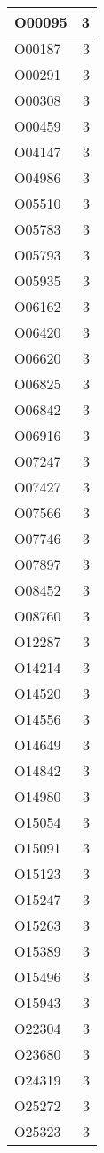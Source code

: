 \documentclass[
]{book}
\theoremstyle{definition}
\theoremstyle{definition}
\theoremstyle{definition}
\theoremstyle{definition}
\theoremstyle{remark}
\begin{document}
\begin{table}
\begin{tabular}{l|r}
\hline
O00095 & 3\\
\hline
O00187 & 3\\
\hline
O00291 & 3\\
\hline
O00308 & 3\\
\hline
O00459 & 3\\
\hline
O04147 & 3\\
\hline
O04986 & 3\\
\hline
O05510 & 3\\
\hline
O05783 & 3\\
\hline
O05793 & 3\\
\hline
O05935 & 3\\
\hline
O06162 & 3\\
\hline
O06420 & 3\\
\hline
O06620 & 3\\
\hline
O06825 & 3\\
\hline
O06842 & 3\\
\hline
O06916 & 3\\
\hline
O07247 & 3\\
\hline
O07427 & 3\\
\hline
O07566 & 3\\
\hline
O07746 & 3\\
\hline
O07897 & 3\\
\hline
O08452 & 3\\
\hline
O08760 & 3\\
\hline
O12287 & 3\\
\hline
O14214 & 3\\
\hline
O14520 & 3\\
\hline
O14556 & 3\\
\hline
O14649 & 3\\
\hline
O14842 & 3\\
\hline
O14980 & 3\\
\hline
O15054 & 3\\
\hline
O15091 & 3\\
\hline
O15123 & 3\\
\hline
O15247 & 3\\
\hline
O15263 & 3\\
\hline
O15389 & 3\\
\hline
O15496 & 3\\
\hline
O15943 & 3\\
\hline
O22304 & 3\\
\hline
O23680 & 3\\
\hline
O24319 & 3\\
\hline
O25272 & 3\\
\hline
O25323 & 3\\

\end{tabular}
\end{table}
\end{document}
